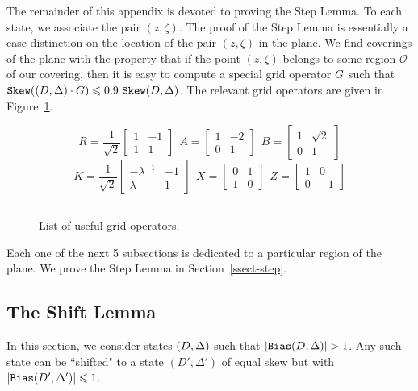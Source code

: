 The remainder of this appendix is devoted to proving the 
Step Lemma. To each state, we associate the pair $(z, 
\zeta)$. The proof of the Step Lemma is essentially 
a case distinction on the location of the pair $(z, 
\zeta)$ in the plane. We find 
coverings of the plane with the property that if the 
point $(z, \zeta)$ belongs to some region 
$\mathcal{O}$ of our covering, then it is easy to compute a 
special grid operator $G$ such that $\sk(\state\cdot \G)\leq 
\formula{\Qstep}~\sk\state$. The relevant grid operators are 
given in Figure~\ref{list_operators}.
%
\begin{figure}
\[
R= \frac{1}{\sqrt{2}}\left[ \begin{array} {cc} 
1 & -1  \\
1 & 1
\end{array} \right]
~~
A = \left[ \begin{array} {cc} 
1 & -2  \\
0 & 1
\end{array} \right]
~~ 
B = \left[ \begin{array} {cc} 
1 & \sqrt{2}  \\
0 & 1
\end{array} \right]
\]
\[
K = \frac{1}{\sqrt{2}}\left[ \begin{array} {cc} 
-\lambda^{-1} & -1  \\
\lambda & 1
\end{array} \right]
~~
X= \left[ \begin{array} {cc} 
0 & 1  \\
1 & 0
\end{array} \right]
~~ 
Z= \left[ \begin{array} {cc} 
1 & 0  \\
0 & -1
\end{array} \right]
\]
\caption{List of useful grid operators.}
\label{list_operators}
\rule{\textwidth}{0.1mm}
\end{figure}
%
Each one of the next 5 subsections is dedicated to a
particular region of the plane. We prove the Step Lemma 
in Section~\ref{ssect-step}.

\subsection{The Shift Lemma}
\label{ssect-shift}

In this section, we consider states $(D,\Delta)$ such that 
$|\bias\state|>1$. Any such state can be ``shifted" to a 
state $(D', \Delta')$ of equal skew but with 
$|\mathtt{Bias}(D', \Delta')|\leqslant 1$.

